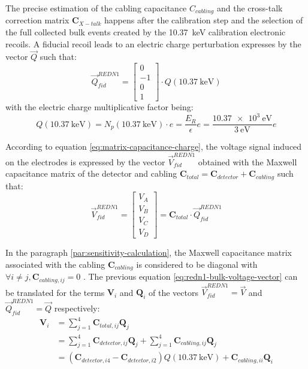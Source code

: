 The precise estimation of the cabling capacitance $C_{cabling}$ and the cross-talk correction matrix $\bm{C}_{X-talk}$ happens after the calibration step and the selection of the full collected bulk events created by the \SI{10.37}{\kilo\eV} calibration electronic recoils.
A fiducial recoil leads to an electric charge perturbation expresses by the vector $\vec{Q}$ such that:
\begin{equation}
\vec{Q}_{fid}^{REDN1} =
\begin{bmatrix}
0 \\ -1 \\ 0 \\ 1
\end{bmatrix}
\cdot Q(\SI{10.37}{\kilo\eV})
\end{equation}
with the electric charge multiplicative factor being:
\begin{equation}
Q(\SI{10.37}{\kilo\eV})
=
N_p(\SI{10.37}{\kilo\eV}) \cdot e
=
\frac{E_R}{\epsilon} e
=
\frac{\SI{10.37e3}{\eV}}{\SI{3}{\eV}} e
\end{equation}

According to equation \ref{eq:matrix-capacitance-charge}, the voltage signal induced on the electrodes is expressed by the vector $\vec{V}_{fid}^{REDN1}$ obtained with the Maxwell capacitance matrix  of the detector and cabling $\bm{C}_{total} = \bm{C}_{detector} + \bm{C}_{cabling}$ such that:
\begin{equation}
\label{eq:redn1-bulk-voltage-vector}
\vec{V}_{fid}^{REDN1}
=
\begin{bmatrix}
V_A \\ V_B \\ V_C \\ V_D
\end{bmatrix}
=
\bm{C}_{total}
\cdot
\vec{Q}_{fid}^{REDN1}
\end{equation}

In the paragraph \ref{par:sensitivity-calculation}, the Maxwell capacitance matrix associated with the cabling $\bm{C}_{cabling}$ is considered to be diagonal with $\forall i \neq j, \bm{C}_{cabling, ij} = 0$ . The previous equation \ref{eq:redn1-bulk-voltage-vector} can be translated for the terms $\bm{V}_{i}$ and $\bm{Q}_i$ of the vectors $\vec{V}_{fid}^{REDN1}=\vec{V}$ and $\vec{Q}_{fid}^{REDN1}=\vec{Q}$ respectively:
\begin{align}
\bm{V}_{i}
&=
\sum_{j=1}^4 \bm{C}_{total, ij} \bm{Q}_j
\\
&=
\sum_{j=1}^4 \bm{C}_{detector, ij} \bm{Q}_j + \sum_{j=1}^4 \bm{C}_{cabling, ij} \bm{Q}_j
\\
&=
\left(
 \bm{C}_{detector, i4} - \bm{C}_{detector, i2}
\right)
Q(\SI{10.37}{\kilo\eV}) + \bm{C}_{cabling, ii} \bm{Q}_i
\end{align}

